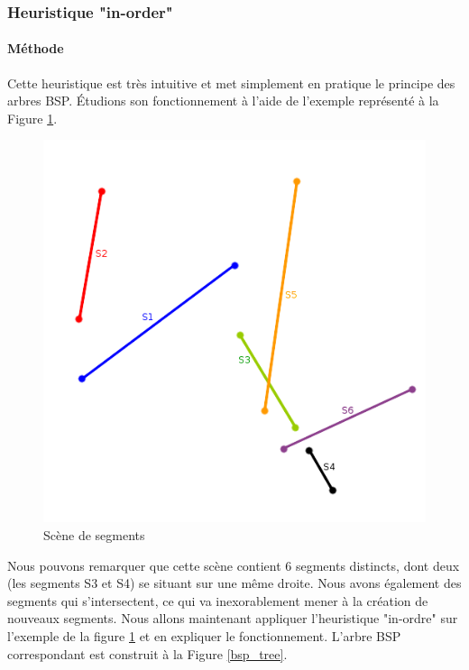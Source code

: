 \documentclass[11pt,a4paper]{article}
\theoremstyle{definition}
\theoremstyle{remark}
\begin{document}
\subsubsection{Heuristique "in-order"}

\paragraph{Méthode}

Cette heuristique est très intuitive et met simplement en pratique le principe des arbres BSP. Étudions son fonctionnement à l'aide de l'exemple représenté à la Figure \ref{scene_inordre}. 

\begin{figure}[H]
\centering
\includegraphics[scale=0.5]{bsp_ex_1.png}
\caption{Scène de segments}
\label{scene_inordre}
\end{figure}

Nous pouvons remarquer que cette scène contient 6 segments distincts, dont deux (les segments S3 et S4) se situant sur une même droite. Nous avons également des segments qui s'intersectent, ce qui va inexorablement mener à la création de nouveaux segments. Nous allons maintenant appliquer l'heuristique "in-ordre" sur l'exemple de la figure \ref{scene_inordre} et en expliquer le fonctionnement. L'arbre BSP correspondant est construit à la Figure \ref{bsp_tree}. \\
\end{document}
